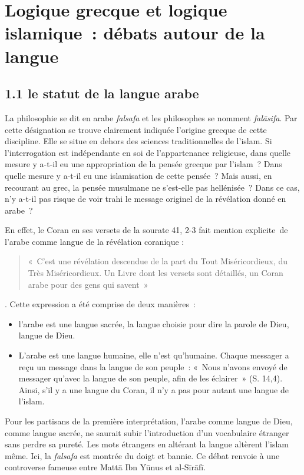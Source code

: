 \section{Logique grecque et logique islamique~:
débats autour de la langue
}


\subsection{1.1 le statut de la langue
arabe}

La philosophie se dit en arabe \emph{falsafa} et les philosophes se
nomment \emph{falāsifa}. Par cette désignation se trouve clairement
indiquée l'origine grecque de cette discipline. Elle se situe en dehors
des sciences traditionnelles de l'islam. Si l'interrogation est
indépendante en soi de l'appartenance religieuse, dans quelle mesure y
a-t-il eu une appropriation de la pensée grecque par l'islam~? Dans
quelle mesure y a-t-il eu une islamisation de cette pensée~? Mais aussi,
en recourant au grec, la pensée musulmane ne s'est-elle pas hellénisée~?
Dans ce cas, n'y a-t-il pas risque de voir trahi le message originel de
la révélation donné en arabe~?

En effet, le Coran en ses versets de la sourate 41, 2-3 fait mention
explicite~de l'arabe comme langue de la révélation coranique :
\begin{quote}
    «~C'est
une révélation descendue de la part du Tout Miséricordieux, du Très
Miséricordieux. Un Livre dont les versets sont détaillés, un Coran arabe
pour des gens qui savent~»
\end{quote}.
Cette expression a été comprise de deux
manières~:

\begin{itemize}
\item
  l'arabe est une langue sacrée, la langue choisie pour dire la parole
  de Dieu, langue de Dieu.
\item
  L'arabe est une langue humaine, elle n'est qu'humaine. Chaque messager
  a reçu un message dans la langue de son peuple~: «~Nous n'avons envoyé
  de messager qu'avec la langue de son peuple, afin de les éclairer~»
  (S. 14,4). Ainsi, s'il y a une langue du Coran, il n'y a pas pour
  autant une langue de l'islam.
\end{itemize}

Pour les partisans de la première interprétation, l'arabe comme langue
de Dieu, comme langue sacrée, ne saurait subir l'introduction d'un
vocabulaire étranger sans perdre sa pureté. Les mots étrangers en
altérant la langue altèrent l'islam même. Ici, la \emph{falsafa} est
montrée du doigt et bannie. Ce débat renvoie à une controverse fameuse
entre Mattā Ibn Yūnus et al-Sīrāfī.


